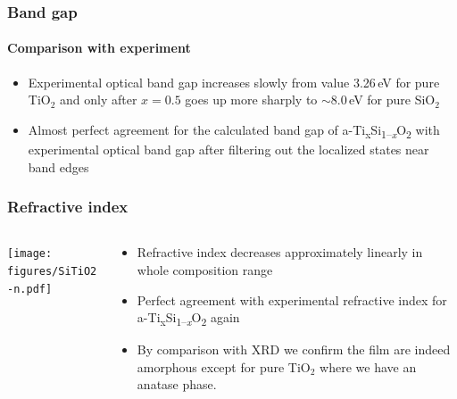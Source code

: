 \documentclass[noamsthm,8pt,t,xcolor={dvipsnames}]{beamer}
\def\TiSiO{Ti\textsubscript{x}Si\textsubscript{1--\itshape x}O\textsubscript{2}}
\begin{document}
\begin{frame}
   \frametitle{Band gap}
   \framesubtitle{Comparison with experiment}

   \begin{center}
   \end{center}

   \begin{itemize}
      \item Experimental optical band gap increases slowly from value 3.26\,eV for pure TiO$_2$ and only after $x = 0.5$ goes up more sharply to $\sim$8.0\,eV for pure SiO$_2$
      \item<2> Almost perfect agreement for the calculated band gap of a-\TiSiO{} with experimental optical band gap after filtering out the localized states near band edges
   \end{itemize}
\end{frame}

\begin{frame}
\frametitle{Refractive index}
   \begin{columns}
      \begin{column}{0.7\textwidth}
         \vspace{-0.8cm}
         \begin{center}
            \texttt{[image: figures/SiTiO2-n.pdf]}

         \end{center}
      \end{column}
      \begin{column}{0.3\textwidth}
            \begin{itemize}
               \item Refractive index decreases approximately linearly in whole composition range
               \item Perfect agreement with experimental refractive index for a-\TiSiO{} again
               \item<2> By comparison with XRD we confirm the film are indeed amorphous except for pure TiO$_2$ where we have an anatase phase.
            \end{itemize}
      \end{column}
   \end{columns}
\end{frame}
\end{document}
